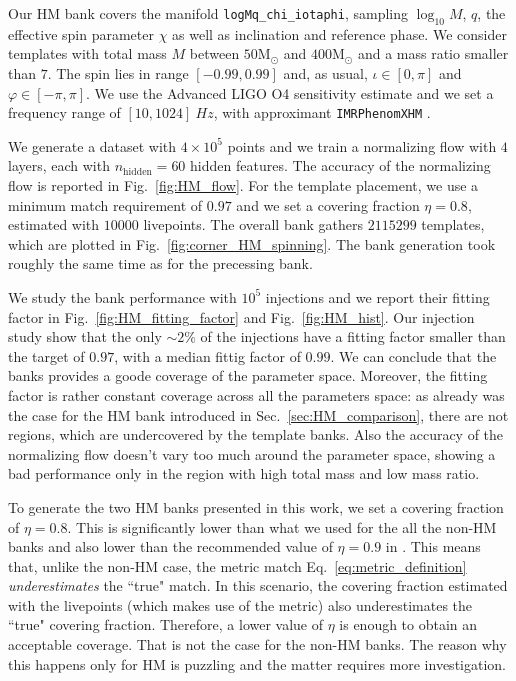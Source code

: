 \documentclass[twocolumn,showpacs,preprintnumbers,nofootinbib,prd,
superscriptaddress,10pt]{revtex4-2}
\begin{document}
Our HM bank covers the manifold \texttt{logMq\_chi\_iotaphi}, sampling $\log_{10}M$, $q$, the effective spin parameter $\chi$ as well as inclination and reference phase.
We consider templates with total mass $M$ between $50 \mathrm{M_\odot}$ and $400 \mathrm{M_\odot}$ and a mass ratio smaller than $7$. The spin lies in range $[-0.99, 0.99]$ and, as usual, $\iota \in [0, \pi]$ and $\varphi \in [-\pi, \pi]$.
We use the Advanced LIGO O4 sensitivity estimate \cite{O4_PSDs} and we set a frequency range of $[10, 1024] \SI{}{Hz}$, with approximant \texttt{IMRPhenomXHM} \cite{Garcia-Quiros:2020qpx}.

We generate a dataset with $4\times 10^5$ points and we train a normalizing flow with $4$ layers, each with $n_\text{hidden} = 60$ hidden features. The accuracy of the normalizing flow is reported in Fig.~\ref{fig:HM_flow}.
For the template placement, we use a minimum match requirement of $0.97$ and we set a covering fraction $\eta = 0.8$, estimated with $10000$ livepoints.
The overall bank gathers $2115299$ templates, which are plotted in Fig.~\ref{fig:corner_HM_spinning}.
The bank generation took roughly the same time as for the precessing bank.

We study the bank performance with $10^5$ injections and we report their fitting factor in Fig.~\ref{fig:HM_fitting_factor} and Fig.~\ref{fig:HM_hist}.
Our injection study show that the only $\sim 2\%$ of the injections have a fitting factor smaller than the target of $0.97$, with a median fittig factor of $0.99$. We can conclude that the banks provides a goode coverage of the parameter space.
Moreover, the fitting factor is rather constant coverage across all the parameters space: as already was the case for the HM bank introduced in Sec.~\ref{sec:HM_comparison}, there are not regions, which are undercovered by the template banks.
Also the accuracy of the normalizing flow doesn't vary too much around the parameter space, showing a bad performance only in the region with high total mass and low mass ratio.

To generate the two HM banks presented in this work, we set a covering fraction of $\eta = 0.8$. This is significantly lower than what we used for the all the non-HM banks and also lower than the recommended value of $\eta = 0.9$ in \cite{Coogan:2022qxs}.
This means that, unlike the non-HM case, the metric match Eq.~\ref{eq:metric_definition} {\it underestimates} the ``true" match. In this scenario, the covering fraction estimated with the livepoints (which makes use of the metric) also underestimates the ``true" covering fraction. Therefore, a lower value of $\eta$ is enough to obtain an acceptable coverage. That is not the case for the non-HM banks.
The reason why this happens only for HM is puzzling and the matter requires more investigation.
\end{document}
